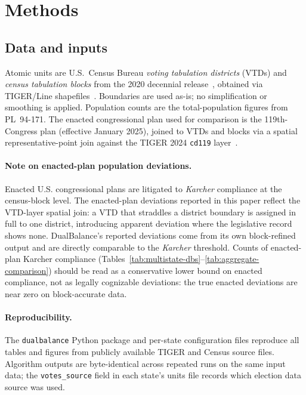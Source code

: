 ﻿\section{Methods}
\label{sec:methods}

\subsection{Data and inputs}
\label{sec:methods-data}

Atomic units are U.S.\ Census Bureau \emph{voting tabulation
districts} (VTDs) and \emph{census tabulation blocks} from the 2020
decennial release~\cite{census2020pl}, obtained via TIGER/Line
shapefiles~\cite{tiger2020}. Boundaries are used as-is; no
simplification or smoothing is applied. Population counts are the
total-population figures from PL~94-171. The enacted congressional
plan used for comparison is the 119th-Congress plan (effective
January 2025), joined to VTDs and blocks via a spatial
representative-point join against the TIGER 2024 \texttt{cd119}
layer~\cite{tiger2024cd119}.

\paragraph{Note on enacted-plan population deviations.}
Enacted U.S. congressional plans are litigated to \textit{Karcher}
compliance at the census-block level. The enacted-plan deviations
reported in this paper reflect the VTD-layer spatial join: a VTD
that straddles a district boundary is assigned in full to one
district, introducing apparent deviation where the legislative
record shows none. DualBalance's reported deviations come from its
own block-refined output and are directly comparable to the
\textit{Karcher} threshold. Counts of enacted-plan Karcher compliance
(Tables~\ref{tab:multistate-dbs}--\ref{tab:aggregate-comparison})
should be read as a conservative lower bound on enacted compliance,
not as legally cognizable deviations: the true enacted deviations
are near zero on block-accurate data.

\paragraph{Reproducibility.}
The \texttt{dualbalance} Python package and per-state configuration
files reproduce all tables and figures from publicly available
TIGER and Census source files.
Algorithm outputs are byte-identical across repeated runs on the
same input data; the \texttt{votes\_source} field in each state's
units file records which election data source was used.

